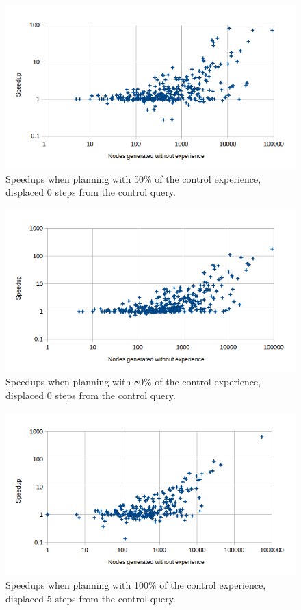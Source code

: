 \documentclass[letterpaper]{article}
\begin{document}
\begin{figure}
	\centering
	\includegraphics[scale=0.5]{Speedup_50_0.png}
	\caption{Speedups when planning with 50\% of the control experience, displaced 0 steps from the control query.}
	 \label{fig:s_50_0}
\end{figure}

\begin{figure}
	\centering
	\includegraphics[scale=0.5]{Speedup_80_0.png}
	\caption{Speedups when planning with 80\% of the control experience, displaced 0 steps from the control query.}
	 \label{fig:s_80_0}
\end{figure}

\begin{figure}
	\centering
	\includegraphics[scale=0.5]{Speedup_100_5.png}
	\caption{Speedups when planning with 100\% of the control experience, displaced 5 steps from the control query.}
	 \label{fig:s_100_5}
\end{figure}
\end{document}
